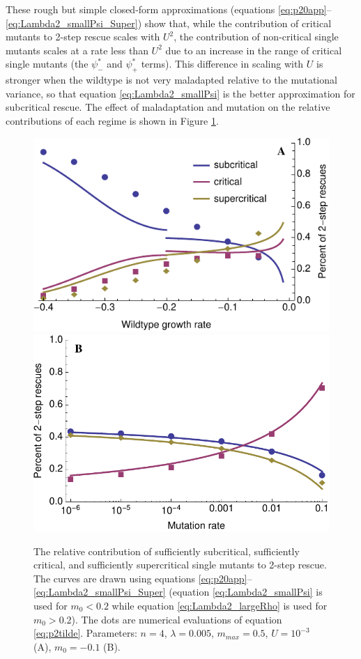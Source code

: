 \documentclass[9pt,twocolumn,twoside,lineno]{gsajnl}
\begin{document}
These rough but simple closed-form approximations (equations \ref{eq:p20app}--\ref{eq:Lambda2_smallPsi_Super}) show that, while the contribution of critical mutants to 2-step rescue scales with $U^2$, the contribution of non-critical single mutants scales at a rate less than $U^2$ due to an increase in the range of critical single mutants (the $\psi^*_-$ and $\psi^*_+$ terms).
This difference in scaling with $U$ is stronger when the wildtype is not very maladapted relative to the mutational variance, so that equation \ref{eq:Lambda2_smallPsi} is the better approximation for subcritical rescue.
The effect of maladaptation and mutation on the relative contributions of each regime is shown in Figure \ref{fig:2stepstyle}.

\begin{figure}[htb]
\centering
\includegraphics[width=\linewidth]{../IMAGES/p2RelContrGrowth.pdf}\\
\includegraphics[width=\linewidth]{../IMAGES/p2RelContrMutationSlow.pdf}
\caption{
The relative contribution of sufficiently subcritical, sufficiently critical, and sufficiently supercritical single mutants to 2-step rescue.
The curves are drawn using equations \ref{eq:p20app}--\ref{eq:Lambda2_smallPsi_Super} (equation \ref{eq:Lambda2_smallPsi} is used for $m_0<0.2$ while equation \ref{eq:Lambda2_largeRho} is used for $m_0>0.2$).
The dots are numerical evaluations of equation \ref{eq:p2tilde}.
Parameters: $n=4$, $\lambda=0.005$, $m_{max}=0.5$, $U=10^{-3}$ (A), $m_0 = -0.1$ (B).
}%
\label{fig:2stepstyle}
\end{figure}
\end{document}
